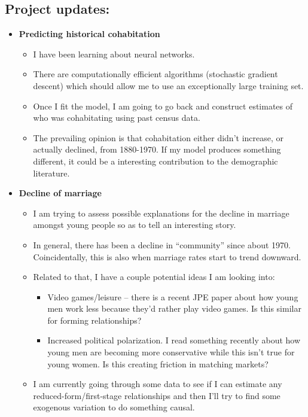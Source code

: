 \documentclass{article}
\begin{document}
\subsection*{Project updates:}
\begin{itemize}
\item \textbf{Predicting historical cohabitation}
\begin{itemize}
\item I have been learning about neural networks.
\item There are computationally efficient algorithms (stochastic gradient descent) which should allow me to use an exceptionally large training set.
\item Once I fit the model, I am going to go back and construct estimates of who was cohabitating using past census data.
\item The prevailing opinion is that cohabitation either didn't increase, or actually declined, from 1880-1970. If my model produces something different, it could be a interesting contribution to the demographic literature.
\end{itemize}


\item \textbf{Decline of marriage}
\begin{itemize}
\item I am trying to assess possible explanations for the decline in marriage amongst young people so as to tell an interesting story.
\item In general, there has been a decline in ``community'' since about 1970. Coincidentally, this is also when marriage rates start to trend downward.
\item Related to that, I have a couple potential ideas I am looking into:
\begin{itemize}
	\item Video games/leisure -- there is a recent JPE paper about how young men work less because they'd rather play video games. Is this similar for forming relationships?
	\item Increased political polarization. I read something recently about how young men are becoming more conservative while this isn't true for young women. Is this creating friction in matching markets?
\end{itemize}
\item I am currently going through some data to see if I can estimate any reduced-form/first-stage relationships and then I'll try to find some exogenous variation to do something causal.
\end{itemize}


\end{itemize}
\end{document}
